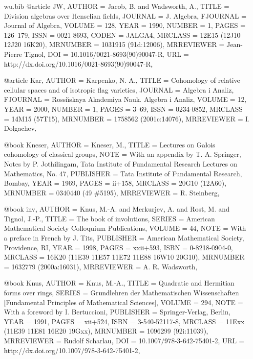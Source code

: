 \documentclass{amsart}
\numberwithin{equation}{section}
\theoremstyle{plain}
\theoremstyle{definition}
\begin{document}
\begin{filecontents}{wu.bib}
@article {JW, 
    AUTHOR = {Jacob, B. and Wadsworth, A.},
     TITLE = {Division algebras over {H}enselian fields},
   JOURNAL = {J. Algebra},
  FJOURNAL = {Journal of Algebra},
    VOLUME = {128},
      YEAR = {1990},
    NUMBER = {1},
     PAGES = {126--179},
      ISSN = {0021-8693},
     CODEN = {JALGA4},
   MRCLASS = {12E15 (12J10 12J20 16K20)},
  MRNUMBER = {1031915 (91d:12006)},
MRREVIEWER = {Jean-Pierre Tignol},
       DOI = {10.1016/0021-8693(90)90047-R},
       URL = {http://dx.doi.org/10.1016/0021-8693(90)90047-R},
}

@article {Kar, 
    AUTHOR = {Karpenko, N. A.},
     TITLE = {Cohomology of relative cellular spaces and of isotropic flag
              varieties},
   JOURNAL = {Algebra i Analiz},
  FJOURNAL = {Rossi\u\i skaya Akademiya Nauk. Algebra i Analiz},
    VOLUME = {12},
      YEAR = {2000},
    NUMBER = {1},
     PAGES = {3--69},
      ISSN = {0234-0852},
   MRCLASS = {14M15 (57T15)},
  MRNUMBER = {1758562 (2001c:14076)},
MRREVIEWER = {I. Dolgachev},
}

@book {Kneser, 
    AUTHOR = {Kneser, M.},
     TITLE = {Lectures on {G}alois cohomology of classical groups},
      NOTE = {With an appendix by T. A. Springer,
              Notes by P. Jothilingam,
              Tata Institute of Fundamental Research Lectures on
              Mathematics, No. 47},
 PUBLISHER = {Tata Institute of Fundamental Research, Bombay},
      YEAR = {1969},
     PAGES = {ii+158},
   MRCLASS = {20G10 (12A60)},
  MRNUMBER = {0340440 (49 \#5195)},
MRREVIEWER = {R. Steinberg},
}

@book {inv, 
    AUTHOR = {Knus, M.-A. and Merkurjev, A. and Rost, M. and
              Tignol, J.-P.},
     TITLE = {The book of involutions},
    SERIES = {American Mathematical Society Colloquium Publications},
    VOLUME = {44},
      NOTE = {With a preface in French by J. Tits},
 PUBLISHER = {American Mathematical Society, Providence, RI},
      YEAR = {1998},
     PAGES = {xxii+593},
      ISBN = {0-8218-0904-0},
   MRCLASS = {16K20 (11E39 11E57 11E72 11E88 16W10 20G10)},
  MRNUMBER = {1632779 (2000a:16031)},
MRREVIEWER = {A. R. Wadsworth},
}

@book {Knus, 
    AUTHOR = {Knus, M.-A.},
     TITLE = {Quadratic and {H}ermitian forms over rings},
    SERIES = {Grundlehren der Mathematischen Wissenschaften [Fundamental
              Principles of Mathematical Sciences]},
    VOLUME = {294},
      NOTE = {With a foreword by I. Bertuccioni},
 PUBLISHER = {Springer-Verlag, Berlin},
      YEAR = {1991},
     PAGES = {xii+524},
      ISBN = {3-540-52117-8},
   MRCLASS = {11Exx (11E39 11E81 16E20 19Gxx)},
  MRNUMBER = {1096299 (92i:11039)},
MRREVIEWER = {Rudolf Scharlau},
       DOI = {10.1007/978-3-642-75401-2},
       URL = {http://dx.doi.org/10.1007/978-3-642-75401-2},
}


\end{filecontents}
\end{document}
